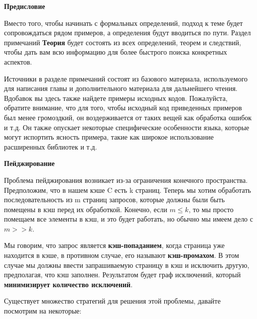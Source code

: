 \textbf{Предисловие}

\vspace{\baselineskip}

Вместо того, чтобы начинать с формальных определений, подход к теме будет сопровождаться рядом примеров, а определения будут вводиться по пути. Раздел примечаний \textbf{Теория} будет состоять из всех определений, теорем и следствий, чтобы дать вам всю информацию для более быстрого поиска конкретных аспектов.

\vspace{\baselineskip}

Источники в разделе примечаний состоят из базового материала, используемого для написания главы и дополнительного материала для дальнейшего чтения. Вдобавок вы здесь также найдете примеры исходных кодов. Пожалуйста, обратите внимание, что для того, чтобы исходный код приведенных примеров был менее громоздкий, он воздерживается от таких вещей как обработка ошибок и т.д. Он также опускает некоторые специфические особенности языка, которые могут испортить ясность примера, такие как широкое использование расширенных библиотек и т.д.

\vspace{\baselineskip}

\textbf{Пейджирование}

\vspace{\baselineskip}

Проблема пейджирования возникает из-за ограничения конечного
пространства. Предположим, что в нашем кэше C есть k страниц. Теперь мы хотим обработать последовательность из m страниц запросов, которые должны были быть помещены в кэш перед их обработкой. Конечно, если $m \leq k$, то мы просто помещаем все элементы в кэш, и это будет работать, но обычно мы имеем дело с $m>>k$.

\vspace{\baselineskip}

Мы говорим, что запрос является \textbf{кэш-попаданием}, когда страница уже находится в кэше, в противном случае, его называют \textbf{кэш-промахом}. В этом случае мы должны ввести запрашиваемую страницу в кэш и исключить другую, предполагая, что кэш заполнен. Результатом будет граф исключений, который \textbf{минимизирует количество исключений}.

\vspace{\baselineskip}

Существует множество стратегий для решения этой проблемы, давайте посмотрим на некоторые:

